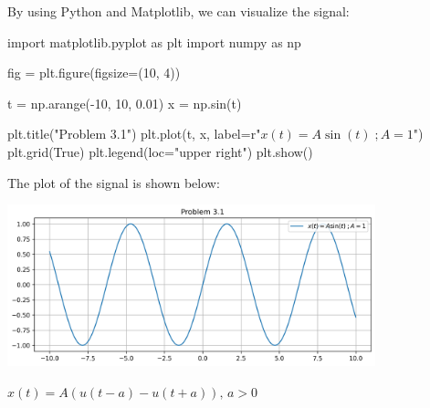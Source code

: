 \documentclass[a4paper, 10pt]{article}
\begin{document}
\begin{solution}
\vspace{2mm}

By using Python and Matplotlib, we can visualize the signal:
\begin{codingbox}
import matplotlib.pyplot as plt
import numpy as np

fig = plt.figure(figsize=(10, 4))

t = np.arange(-10, 10, 0.01)
x = np.sin(t)

plt.title("Problem 3.1")
plt.plot(t, x, label=r"$x(t) = A\sin(t) \;; A = 1$")
plt.grid(True)
plt.legend(loc="upper right")
plt.show()
\end{codingbox}

\newpage

The plot of the signal is shown below:
\begin{center}
    \includegraphics[width=0.8\textwidth]{images/problem_3_1.png}
\end{center}
\end{solution}


\begin{subproblems}[start=2]
    \item \( x(t) = A(u(t-a) - u(t+a)), \, a > 0 \)
\end{subproblems}
\end{document}

